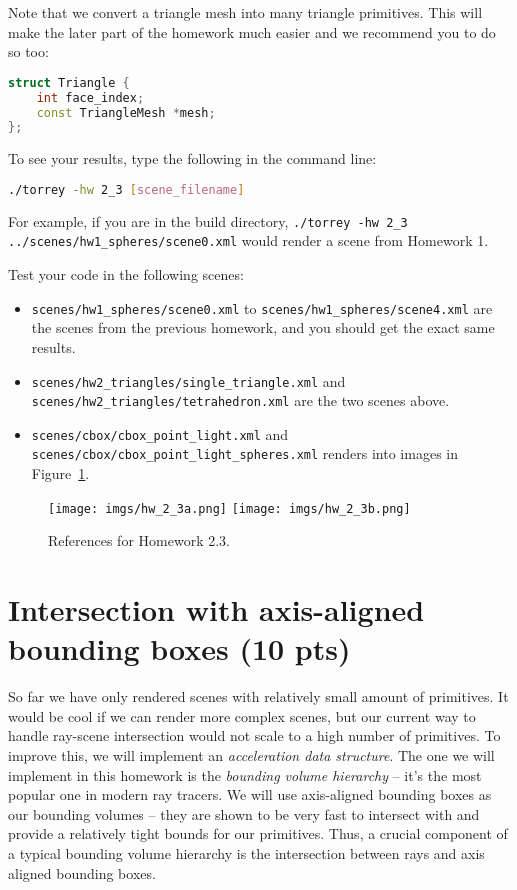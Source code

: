 Note that we convert a triangle mesh into many triangle primitives. This will make the later part of the homework much easier and we recommend you to do so too:
\begin{lstlisting}[language=C++]
struct Triangle {
    int face_index;
    const TriangleMesh *mesh;
};
\end{lstlisting}

To see your results, type the following in the command line:
\begin{lstlisting}[language=bash]
./torrey -hw 2_3 [scene_filename]
\end{lstlisting}
For example, if you are in the build directory, \lstinline{./torrey -hw 2_3 ../scenes/hw1_spheres/scene0.xml} would render a scene from Homework 1.

Test your code in the following scenes: 
\begin{itemize}
  \item \lstinline{scenes/hw1_spheres/scene0.xml} to \lstinline{scenes/hw1_spheres/scene4.xml} are the scenes from the previous homework, and you should get the exact same results. 
  \item \lstinline{scenes/hw2_triangles/single_triangle.xml} and \lstinline{scenes/hw2_triangles/tetrahedron.xml} are the two scenes above.
  \item \lstinline{scenes/cbox/cbox_point_light.xml} and \lstinline{scenes/cbox/cbox_point_light_spheres.xml} renders into images in Figure~\ref{fig:hw_2_3}.
\end{itemize}

\begin{figure}[ht]
    \centering
    \texttt{[image: imgs/hw\_2\_3a.png]}
    \texttt{[image: imgs/hw\_2\_3b.png]}
    \caption{References for Homework 2.3.}
    \label{fig:hw_2_3}
\end{figure}

\section{Intersection with axis-aligned bounding boxes (10 pts)}
So far we have only rendered scenes with relatively small amount of primitives. It would be cool if we can render more complex scenes, but our current way to handle ray-scene intersection would not scale to a high number of primitives. To improve this, we will implement an \emph{acceleration data structure}. The one we will implement in this homework is the \emph{bounding volume hierarchy} -- it's the most popular one in  modern ray tracers. We will use axis-aligned bounding boxes as our bounding volumes -- they are shown to be very fast to intersect with and provide a relatively tight bounds for our primitives. Thus, a crucial component of a typical bounding volume hierarchy is the intersection between rays and axis aligned bounding boxes. 


